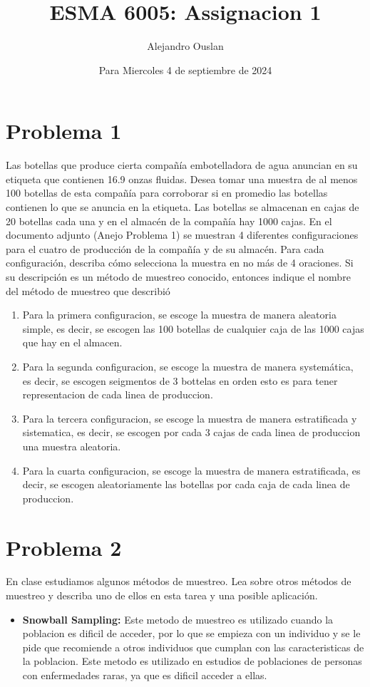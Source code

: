 \documentclass[10pt, oneside]{article}
\title{ESMA 6005: Assignacion 1}
\author{Alejandro Ouslan}
\date{Para Miercoles 4 de septiembre de 2024}
\begin{document}
\maketitle

\vspace{.25in}

\section{Problema 1}
Las botellas que produce cierta compañía embotelladora de agua anuncian en su etiqueta que
contienen 16.9 onzas fluidas. Desea tomar una muestra de al menos 100 botellas de esta
compañía para corroborar si en promedio las botellas contienen lo que se anuncia en la
etiqueta. Las botellas se almacenan en cajas de 20 botellas cada una y en el almacén de la
compañía hay 1000 cajas. En el documento adjunto (Anejo Problema 1) se muestran 4
diferentes configuraciones para el cuatro de producción de la compañía y de su almacén. Para
cada configuración, describa cómo selecciona la muestra en no más de 4 oraciones. Si su
descripción es un método de muestreo conocido, entonces indique el nombre del método de
muestreo que describió

\begin{enumerate}
	\item Para la primera configuracion, se escoge la muestra de manera aleatoria simple, es decir,
	      se escogen las 100 botellas de cualquier caja de las 1000 cajas que hay en el almacen.
	\item Para la segunda configuracion, se escoge la muestra de manera systemática, es decir, se escogen
	      seigmentos de 3 bottelas en orden esto es para tener representacion de cada linea de produccion.
	\item Para la tercera configuracion, se escoge la muestra de manera estratificada y sistematica,
	      es decir, se escogen por cada 3 cajas de cada linea de produccion una muestra aleatoria.
	\item Para la cuarta configuracion, se escoge la muestra de manera estratificada, es decir, se escogen
	      aleatoriamente las botellas por cada caja de cada linea de produccion.
\end{enumerate}

\section{Problema 2}
En clase estudiamos algunos métodos de muestreo. Lea sobre otros métodos de muestreo y
describa uno de ellos en esta tarea y una posible aplicación.

\begin{itemize}
	\item \textbf{Snowball Sampling:} Este metodo de muestreo es utilizado cuando la poblacion es dificil de
	      acceder, por lo que se empieza con un individuo y se le pide que recomiende a otros individuos que
	      cumplan con las caracteristicas de la poblacion. Este metodo es utilizado en estudios de poblaciones
	      de personas con enfermedades raras, ya que es dificil acceder a ellas.
\end{itemize}
\end{document}
